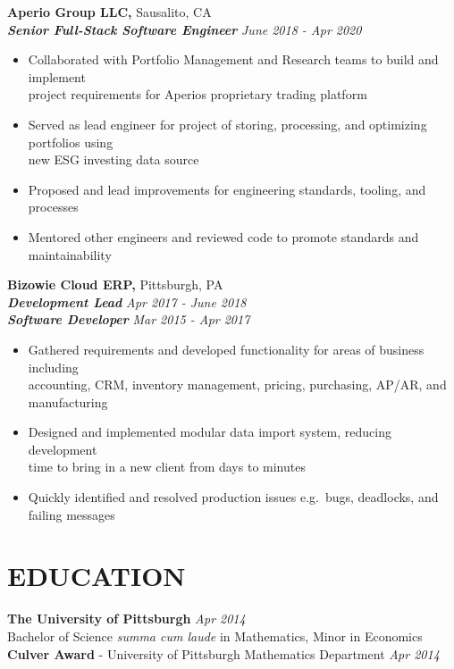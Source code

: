\documentclass[]{resume}
\newcommand\tab[1][.5cm]{\hspace*{#1}}
\begin{document}
\begin{resume}
\vspace{0.9mm}
\textbf{\large Aperio Group LLC,} {\large Sausalito, CA}\\
\tab \textbf{\textit{Senior Full-Stack Software Engineer}} \hfill \textit{June 2018 - Apr 2020}
\begin{itemize}
    \item
    Collaborated with Portfolio Management and Research teams to build and implement \\
    project requirements for Aperio\textsc{}s proprietary trading platform
    \item
    Served as lead engineer for project of storing, processing, and optimizing portfolios using \\
    new ESG investing data source
    \item
    Proposed and lead improvements for engineering standards, tooling, and processes
    \item
    Mentored other engineers and reviewed code to promote standards and maintainability
\end{itemize}


\textbf{\large Bizowie Cloud ERP,} {\large Pittsburgh, PA}\\
\tab\textbf{\textit{Development Lead}} \hfill \textit{Apr 2017 - June 2018}\\
\tab \textbf{\textit{Software Developer}}  \hfill \textit{Mar 2015 - Apr 2017}
\begin{itemize}
    \item
    Gathered requirements and developed functionality for areas of business including \\
    accounting, CRM, inventory management, pricing, purchasing, AP/AR, and manufacturing
    \item
    Designed and implemented modular data import system, reducing development \\
    time to bring in a new client from days to minutes
    \item 
    Quickly identified and resolved production issues e.g.\ bugs, deadlocks, and failing messages
\end{itemize}


\section{EDUCATION\makebox[372 px]{\rule[.5 ex]{372 px}{1.0pt}}}
\vspace{0.9mm}
\textbf{\large The University of Pittsburgh} \hfill \textit{Apr 2014}\vspace{0.7mm}\\ 
\hspace*{4mm}Bachelor of Science \emph{summa cum laude} in Mathematics, Minor in Economics\\ %
\textbf{Culver Award}  - University of Pittsburgh Mathematics Department  \hfill \textit{Apr 2014}\vspace{0.7mm}\clearpage
\end{resume}
\end{document}
